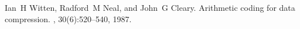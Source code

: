 \documentclass[a4paper,english]{article}
\begin{document}
\providecommand{\bysame}{\leavevmode\hbox to3em{\hrulefill}\thinspace}
\begin{thebibliography}{1}
Ian~H Witten, Radford~M Neal, and John~G Cleary.
\newblock Arithmetic coding for data compression.
, 30(6):520--540, 1987.

\end{thebibliography}
\end{document}
